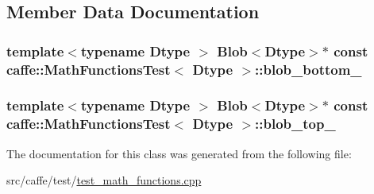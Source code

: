 \subsection{Member Data Documentation}
\hypertarget{classcaffe_1_1_math_functions_test_acd87accc66124e064d86484a4213afd8}{
\subsubsection[{blob\+\_\+bottom\+\_\+}]{\setlength{\rightskip}{0pt plus 5cm}template$<$typename Dtype $>$ {\bf Blob}$<$Dtype$>$$\ast$ const {\bf caffe\+::\+Math\+Functions\+Test}$<$ Dtype $>$\+::blob\+\_\+bottom\+\_\+\hspace{0.3cm}{\ttfamily [protected]}}}\label{classcaffe_1_1_math_functions_test_acd87accc66124e064d86484a4213afd8}
\hypertarget{classcaffe_1_1_math_functions_test_a260c2e90738ed8b2d66e18f7589ffef0}{
\subsubsection[{blob\+\_\+top\+\_\+}]{\setlength{\rightskip}{0pt plus 5cm}template$<$typename Dtype $>$ {\bf Blob}$<$Dtype$>$$\ast$ const {\bf caffe\+::\+Math\+Functions\+Test}$<$ Dtype $>$\+::blob\+\_\+top\+\_\+\hspace{0.3cm}{\ttfamily [protected]}}}\label{classcaffe_1_1_math_functions_test_a260c2e90738ed8b2d66e18f7589ffef0}


The documentation for this class was generated from the following file\+:\begin{DoxyCompactItemize}
\item 
src/caffe/test/\hyperlink{test__math__functions_8cpp}{test\+\_\+math\+\_\+functions.\+cpp}\end{DoxyCompactItemize}
